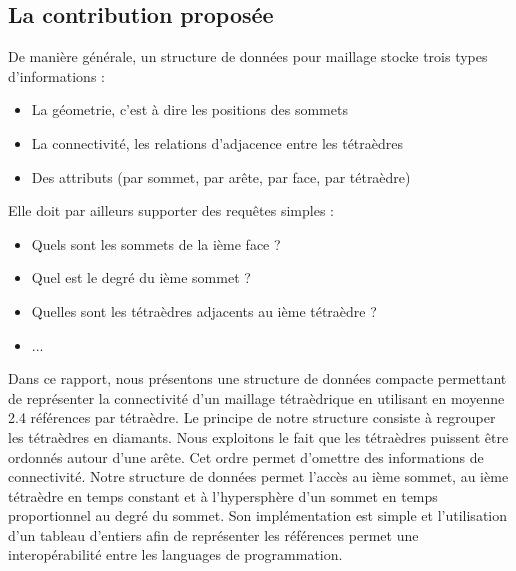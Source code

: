 \subsection*{La contribution proposée}
\noindent
De manière générale, un structure de données pour maillage stocke trois types d'informations :
\begin{itemize}
\item La géometrie, c'est à dire les positions des sommets
\item La connectivité, les relations d'adjacence entre les tétraèdres
\item Des attributs (par sommet, par arête, par face, par tétraèdre)\\
\end{itemize}
Elle doit par ailleurs supporter des requêtes simples :
\begin{itemize}
\item Quels sont les sommets de la ième face ?
\item Quel est le degré du ième sommet ?
\item Quelles sont les tétraèdres adjacents au ième tétraèdre ?
\item ...
\end{itemize}
Dans ce rapport, nous présentons une structure de données compacte permettant de représenter la connectivité d'un maillage tétraèdrique en utilisant en moyenne 2.4 références par tétraèdre. Le principe de notre structure consiste à regrouper les tétraèdres en diamants. Nous exploitons le fait que les tétraèdres puissent être ordonnés autour d'une arête. Cet ordre permet d'omettre des informations de connectivité. Notre structure de données permet l'accès au ième sommet, au ième tétraèdre en temps constant et à l'hypersphère d'un sommet en temps proportionnel au degré du sommet. Son implémentation est simple et l'utilisation d'un tableau d'entiers afin de représenter les références permet une interopérabilité entre les languages de programmation.


